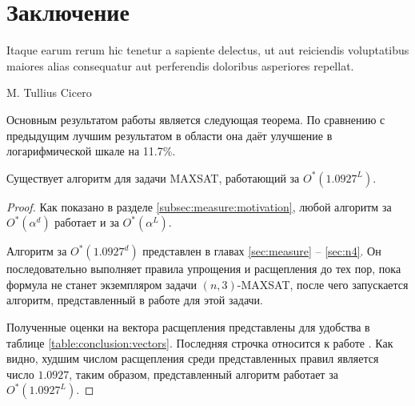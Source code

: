 
\section*{Заключение}
\label{sec:conclusion}

\renewcommand{\textflush}{flushepinormal}
\begin{otherlanguage}{latin}
 \epigraph{Itaque earum rerum hic tenetur a sapiente delectus, ut aut reiciendis voluptatibus maiores alias consequatur aut perferendis doloribus asperiores repellat.}{M. Tullius Cicero}
\end{otherlanguage}

Основным результатом работы является следующая теорема. По сравнению с предыдущим лучшим результатом в области \cite{bansal99} она даёт улучшение в логарифмической шкале на 11.7\%.

\setcounter{section}{5}
\setcounter{lemma}{0}
\begin{theorem}
 Существует алгоритм для задачи MAXSAT, работающий за $O^*(1.0927^L)$.
\end{theorem}

\begin{proof}
 Как показано в разделе \ref{subsec:measure:motivation}, любой алгоритм за $O^*(\alpha^d)$ работает и за $O^*(\alpha^L)$.

 Алгоритм за $O^*(1.0927^d)$ представлен в главах \ref{sec:measure} -- \ref{sec:n4}. Он последовательно выполняет правила упрощения и расщепления до тех пор, пока формула не станет экземпляром задачи $(n,3)$-MAXSAT, после чего запускается алгоритм, представленный в работе \cite{belova18} для этой задачи.

 Полученные оценки на вектора расщепления представлены для удобства в таблице \ref{table:conclusion:vectors}. Последняя строчка относится к работе \cite{belova18}. Как видно, худшим числом расщепления среди представленных правил является число $1.0927$, таким образом, представленный алгоритм работает за $O^*(1.0927^L)$.
\end{proof}

